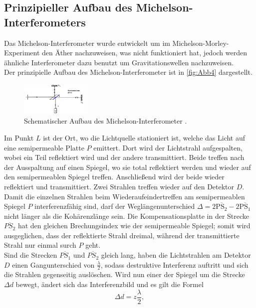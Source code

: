 \subsection{Prinzipieller Aufbau des Michelson-Interferometers}
\label{Aufbau_theo}
Das Michelson-Interferometer wurde entwickelt um im Michelson-Morley-Experiment den Äther nachzuweisen, was nicht funktioniert hat, jedoch werden 
ähnliche Interferometer dazu benutzt um Gravitationswellen nachzuweisen.\\
Der prinzipielle Aufbau des Michelson-Interferometer ist in \autoref{fig:Abb4} dargestellt.
\begin{figure}[H]
    \centering
    \includegraphics[width=0.3\textwidth]{build/Abb4.PNG}
    \caption {Schematischer Aufbau des Michelson-Interferometer \cite[3]{V401}.}
    \label{fig:Abb4}
\end{figure}
Im Punkt $L$ ist der Ort, wo die Lichtquelle stationiert ist, welche das Licht auf eine semipermeable Platte $P$ emittert.
Dort wird der Lichtstrahl aufgespalten, wobei ein Teil reflektiert wird und der andere transmittiert.
Beide treffen nach der Ausspaltung auf einen Spiegel, wo sie total reflektiert werden und wieder auf den semipermeablen Spiegel treffen.
Anschließend wird der beide wieder reflektiert und transmittiert. 
Zwei Strahlen treffen wieder auf den Detektor $D$. 
Damit die einzelnen Strahlen beim Wiederaufeindertreffen am semipermeablen Spiegel $P$ interferenzfähig sind, darf der Weglängenunterschied 
$ \Delta = 2\overline{\text{PS}_2} - 2\overline{\text{PS}_1} $ nicht länger als die Kohärenzlänge sein. 
Die Kompensationsplatte in der Strecke $\overline{PS_2}$ hat den gleichen Brechungsindex wie der semipermeable Spiegel; somit wird ausgeglichen,
dass der reflektierte Strahl dreimal, während der transmittierte Strahl nur einmal surch $P$ geht.\\
Sind die Strecken $\overline{PS_1}$ und $\overline{PS_2}$ gleich lang, haben die Lichtstrahlen am Detektor $D$ einen Gangunterschied von $\frac{\lambda}{2}$,
sodass destruktive Interferenz auftritt und sich die Strahlen gegenseitig auslöschen.
Wird nun einer der Spiegel um die Strecke $\Delta d$ bewegt, ändert sich das Interferenzbild und es gilt die Formel
\begin{equation}
    \Delta d = z \frac{\lambda}{2},
    \label{eqn:d}
\end{equation}
